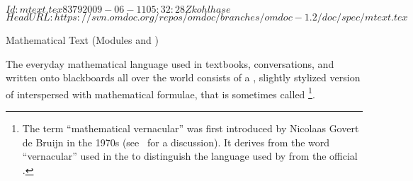 \svnInfo $Id: mtext.tex 8379 2009-06-11 05:32:28Z kohlhase $
\svnKeyword $HeadURL: https://svn.omdoc.org/repos/omdoc/branches/omdoc-1.2/doc/spec/mtext.tex $

\begin{tchapter}[id=mtxt,short=Mathematical Text]{Mathematical Text (Modules
  {} and {})}

The everyday mathematical language used in textbooks, conversations, and written onto
blackboards all over the world consists of a {}, slightly stylized
version of {} interspersed with mathematical formulae, that is
sometimes called {}\footnote{The term ``mathematical
  vernacular'' was first introduced by Nicolaas Govert de Bruijn in the 1970s
  (see~\cite{DeBruijn:tmv94} for a discussion). It derives from the word ``vernacular''
  used in the {} to distinguish the language used by
  {} from the official {}.}.


\end{tchapter}

